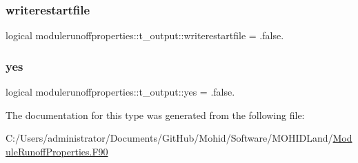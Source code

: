\subsubsection{\texorpdfstring{writerestartfile}{writerestartfile}}
{\footnotesize\ttfamily logical modulerunoffproperties\+::t\+\_\+output\+::writerestartfile = .false.\hspace{0.3cm}{\ttfamily [private]}}

\mbox{\label{structmodulerunoffproperties_1_1t__output_a286273cb5aba2d49d60eb3925a74f093}} 
\subsubsection{\texorpdfstring{yes}{yes}}
{\footnotesize\ttfamily logical modulerunoffproperties\+::t\+\_\+output\+::yes = .false.\hspace{0.3cm}{\ttfamily [private]}}



The documentation for this type was generated from the following file\+:\begin{DoxyCompactItemize}
\item 
C\+:/\+Users/administrator/\+Documents/\+Git\+Hub/\+Mohid/\+Software/\+M\+O\+H\+I\+D\+Land/\mbox{\hyperlink{_module_runoff_properties_8_f90}{Module\+Runoff\+Properties.\+F90}}\end{DoxyCompactItemize}

